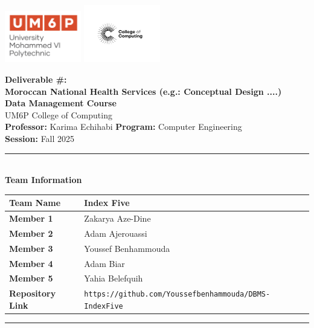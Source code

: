 \documentclass[a4paper,12pt]{article}
\begin{document}
\thispagestyle{empty}
\begin{center}
  \includegraphics[width=0.25\textwidth]{Figures/UM6Plogo.png}\hfill
  \includegraphics[width=0.25\textwidth]{Figures/CC.jpg}
  \vspace{1.2cm}

  {\LARGE \textbf{Deliverable \#: \\[0.5cm] Moroccan National Health Services (e.g.: Conceptual Design ....)}}\\[0.6cm]
  {\large \textbf{Data Management Course}}\\[0.2cm]
  {\large UM6P College of Computing}\\[0.8cm]

  {\normalsize \textbf{Professor:} Karima Echihabi \quad 
   \textbf{Program:} Computer Engineering}\\[0.1cm]
  {\normalsize \textbf{Session:} Fall 2025}\\[1cm]

  \rule{0.9\textwidth}{0.5pt}\\[0.5cm]
  {\large \textbf{Team Information}} \\[0.3cm]
  \begin{tabular}{|l|l|}
    \hline
    \textbf{Team Name} & Index Five \\ \hline
    \textbf{Member 1}  & Zakarya Aze-Dine  \\ \hline
    \textbf{Member 2}  & Adam Ajerouassi   \\ \hline
    \textbf{Member 3}  & Youssef Benhammouda   \\ \hline
    \textbf{Member 4}  & Adam Biar   \\ \hline
    \textbf{Member 5}  & Yahia Belefquih   \\ \hline


    \textbf{Repository Link} & \texttt{https://github.com/Youssefbenhammouda/DBMS-IndexFive} \\ \hline
  \end{tabular}
  \rule{0.9\textwidth}{0.5pt}\\
\end{center}
\clearpage
\pagestyle{fancy}
\end{document}
